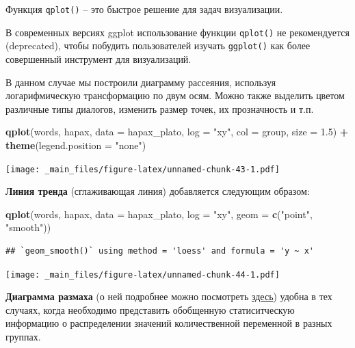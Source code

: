 \documentclass[
]{book}
\newenvironment{Shaded}{\begin{snugshade}}{\end{snugshade}}
\newcommand{\AttributeTok}[1]{\textcolor[rgb]{0.13,0.29,0.53}{#1}}
\newcommand{\FloatTok}[1]{\textcolor[rgb]{0.00,0.00,0.81}{#1}}
\newcommand{\FunctionTok}[1]{\textcolor[rgb]{0.13,0.29,0.53}{\textbf{#1}}}
\newcommand{\NormalTok}[1]{#1}
\newcommand{\SpecialCharTok}[1]{\textcolor[rgb]{0.81,0.36,0.00}{\textbf{#1}}}
\newcommand{\StringTok}[1]{\textcolor[rgb]{0.31,0.60,0.02}{#1}}
\theoremstyle{definition}
\theoremstyle{definition}
\theoremstyle{definition}
\theoremstyle{definition}
\theoremstyle{remark}
\begin{document}
Функция \texttt{qplot()} -- это быстрое решение для задач визуализации.

В современных версиях ggplot использование функции \texttt{qplot()} не рекомендуется (deprecated), чтобы побудить пользователей изучать \texttt{ggplot()} как более совершенный инструмент для визуализаций.

В данном случае мы построили диаграмму рассеяния, используя логарифмическую трансформацию по двум осям. Можно также выделить цветом различные типы диалогов, изменить размер точек, их прозначность и т.п.

\begin{Shaded}
\begin{Highlighting}[]
\FunctionTok{qplot}\NormalTok{(words, hapax, }\AttributeTok{data =}\NormalTok{ hapax\_plato, }\AttributeTok{log =} \StringTok{"xy"}\NormalTok{, }\AttributeTok{col =}\NormalTok{ group, }\AttributeTok{size =} \FloatTok{1.5}\NormalTok{) }\SpecialCharTok{+} \FunctionTok{theme}\NormalTok{(}\AttributeTok{legend.position =} \StringTok{"none"}\NormalTok{)}
\end{Highlighting}
\end{Shaded}

\texttt{[image: \_main\_files/figure-latex/unnamed-chunk-43-1.pdf]}

\textbf{Линия тренда} (сглаживающая линия) добавляется следующим образом:

\begin{Shaded}
\begin{Highlighting}[]
\FunctionTok{qplot}\NormalTok{(words, hapax, }\AttributeTok{data =}\NormalTok{ hapax\_plato, }\AttributeTok{log =} \StringTok{"xy"}\NormalTok{, }\AttributeTok{geom =} \FunctionTok{c}\NormalTok{(}\StringTok{"point"}\NormalTok{, }\StringTok{"smooth"}\NormalTok{))}
\end{Highlighting}
\end{Shaded}

\begin{verbatim}
## `geom_smooth()` using method = 'loess' and formula = 'y ~ x'
\end{verbatim}

\texttt{[image: \_main\_files/figure-latex/unnamed-chunk-44-1.pdf]}

\textbf{Диаграмма размаха} (о ней подробнее можно посмотреть \href{https://vk.com/video_ext.php?oid=-211800158\&id=456239229\&hash=7e1bc800e53df22c\&hd=2}{здесь}) удобна в тех случаях, когда необходимо представить обобщенную статиситческую информацию о распределении значений количественной переменной в разных группах.
\end{document}
